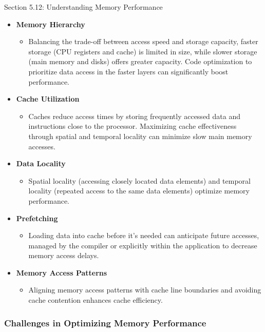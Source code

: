 \begin{notes}{Section 5.12: Understanding Memory Performance}
    \begin{itemize}
        \item \textbf{Memory Hierarchy}
        \begin{itemize}
            \item Balancing the trade-off between access speed and storage capacity, faster storage (CPU registers and cache) is limited in size, while slower storage (main memory and disks) offers 
            greater capacity. Code optimization to prioritize data access in the faster layers can significantly boost performance.
        \end{itemize}
        \item \textbf{Cache Utilization}
        \begin{itemize}
            \item Caches reduce access times by storing frequently accessed data and instructions close to the processor. Maximizing cache effectiveness through spatial and temporal locality can 
            minimize slow main memory accesses.
        \end{itemize}
        \item \textbf{Data Locality}
        \begin{itemize}
            \item Spatial locality (accessing closely located data elements) and temporal locality (repeated access to the same data elements) optimize memory performance.
        \end{itemize}
        \item \textbf{Prefetching}
        \begin{itemize}
            \item Loading data into cache before it's needed can anticipate future accesses, managed by the compiler or explicitly within the application to decrease memory access delays.
        \end{itemize}
        \item \textbf{Memory Access Patterns}
        \begin{itemize}
            \item Aligning memory access patterns with cache line boundaries and avoiding cache contention enhances cache efficiency.
        \end{itemize}
    \end{itemize}
    
    \subsubsection*{Challenges in Optimizing Memory Performance}
    

\end{notes}
